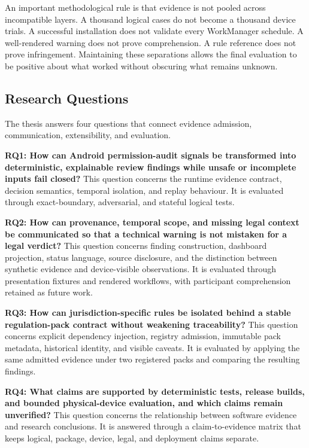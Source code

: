 An important methodological rule is that evidence is not pooled across incompatible layers. A thousand logical cases do not become a thousand device trials. A successful installation does not validate every WorkManager schedule. A well-rendered warning does not prove comprehension. A rule reference does not prove infringement. Maintaining these separations allows the final evaluation to be positive about what worked without obscuring what remains unknown.

\subsection{Research Questions}

The thesis answers four questions that connect evidence admission, communication, extensibility, and evaluation.

\textbf{RQ1: How can Android permission-audit signals be transformed into deterministic, explainable review findings while unsafe or incomplete inputs fail closed?} This question concerns the runtime evidence contract, decision semantics, temporal isolation, and replay behaviour. It is evaluated through exact-boundary, adversarial, and stateful logical tests.

\textbf{RQ2: How can provenance, temporal scope, and missing legal context be communicated so that a technical warning is not mistaken for a legal verdict?} This question concerns finding construction, dashboard projection, status language, source disclosure, and the distinction between synthetic evidence and device-visible observations. It is evaluated through presentation fixtures and rendered workflows, with participant comprehension retained as future work.

\textbf{RQ3: How can jurisdiction-specific rules be isolated behind a stable regulation-pack contract without weakening traceability?} This question concerns explicit dependency injection, registry admission, immutable pack metadata, historical identity, and visible caveats. It is evaluated by applying the same admitted evidence under two registered packs and comparing the resulting findings.

\textbf{RQ4: What claims are supported by deterministic tests, release builds, and bounded physical-device evaluation, and which claims remain unverified?} This question concerns the relationship between software evidence and research conclusions. It is answered through a claim-to-evidence matrix that keeps logical, package, device, legal, and deployment claims separate.

